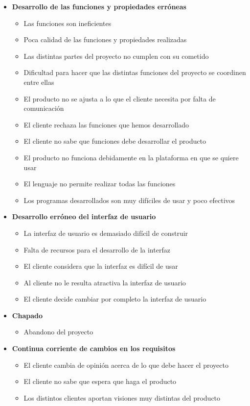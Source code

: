 \documentclass[spanish,a4paper,12pt]{report}	%
\begin{document}
\begin{itemize}
\begin{itemize}
	\end{itemize}
\item \textbf {Desarrollo de las funciones y propiedades erróneas}
	\begin{itemize}
		\item {Las funciones son ineficientes}
		\item {Poca calidad de las funciones y propiedades realizadas}
		\item {Las distintas partes del proyecto no cumplen con su cometido}
		\item {Dificultad para hacer que las distintas funciones del proyecto se coordinen entre ellas}
		\item {El producto no se ajusta a lo que el cliente necesita por falta de comunicación}
		\item {El cliente rechaza las funciones que hemos desarrollado}
		\item {El cliente no sabe que funciones debe desarrollar el producto}
		\item {El producto no funciona debidamente en la plataforma en que se quiere usar}
		\item {El lenguaje no permite realizar todas las funciones}
		\item {Los programas desarrollados son muy difíciles de usar y poco efectivos}	
	\end{itemize}
\item \textbf {Desarrollo erróneo del interfaz de usuario}
	\begin{itemize}
		\item {La interfaz de usuario es demasiado difícil de construir}
		\item {Falta de recursos para el desarrollo de la interfaz}
		\item {El cliente considera que la interfaz es difícil de usar}
		\item {Al cliente no le resulta atractiva la interfaz de usuario}
		\item {El cliente decide cambiar por completo la interfaz de usuario}
	\end{itemize}
\item \textbf {Chapado}
	\begin{itemize}
		\item {Abandono del proyecto}
	\end{itemize}
\item \textbf {Continua corriente de cambios en los requisitos}
	\begin{itemize}
		\item {El cliente cambia de opinión acerca de lo que debe hacer el proyecto}
		\item {El cliente no sabe que espera que haga el producto}
		\item {Los distintos clientes aportan visiones muy distintas del producto}


\end{itemize}
\end{itemize}
\end{document}
